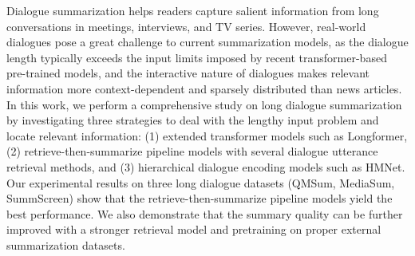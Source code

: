 Dialogue summarization helps readers capture salient information from long conversations in meetings, interviews, and TV series. However, real-world dialogues pose a great challenge to current summarization models, as the dialogue length typically exceeds the input limits imposed by recent transformer-based pre-trained models, and the interactive nature of dialogues makes relevant information more context-dependent and sparsely distributed than news articles. In this work, we perform a comprehensive study on long dialogue summarization by investigating three strategies to deal with the lengthy input problem and locate relevant information: (1) extended transformer models such as Longformer, (2) retrieve-then-summarize pipeline models with several dialogue utterance retrieval methods, and (3) hierarchical dialogue encoding models such as HMNet. Our experimental results on three long dialogue datasets (QMSum, MediaSum, SummScreen) show that the retrieve-then-summarize pipeline models yield the best performance. We also demonstrate that the summary quality can be further improved with a stronger retrieval model and pretraining on proper external summarization datasets.
